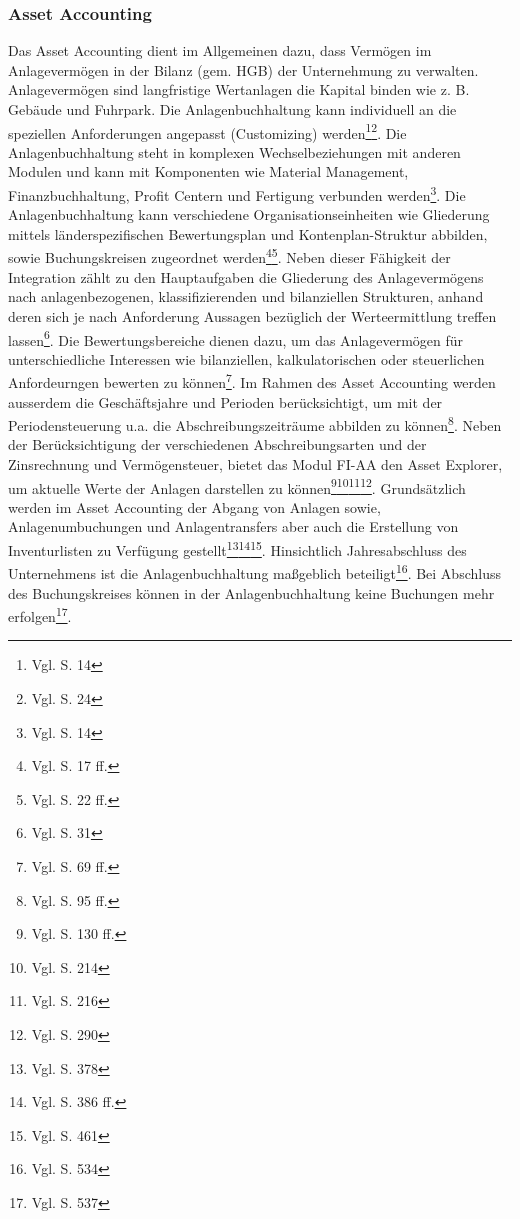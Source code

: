 \subsubsection{Asset Accounting} %
Das Asset Accounting dient im Allgemeinen dazu, dass Vermögen im Anlagevermögen in der Bilanz (gem. HGB) der Unternehmung zu verwalten. Anlagevermögen sind langfristige Wertanlagen die Kapital binden wie z. B. Gebäude und Fuhrpark. Die Anlagenbuchhaltung kann individuell an die speziellen Anforderungen angepasst (Customizing) werden\footnote{Vgl. \cite{SAPFIAA2001} S. 14}\footnote{Vgl. \cite{SAPFIAA2001} S. 24}. 
Die Anlagenbuchhaltung steht in komplexen Wechselbeziehungen mit anderen Modulen und kann mit Komponenten wie Material Management, Finanzbuchhaltung, Profit Centern und Fertigung verbunden werden\footnote{Vgl. \cite{SAPFIAA2001} S. 14}. Die Anlagenbuchhaltung kann verschiedene Organisationseinheiten wie Gliederung mittels länderspezifischen Bewertungsplan und Kontenplan-Struktur abbilden, sowie Buchungskreisen zugeordnet werden\footnote{Vgl. \cite{SAPFIAA2001} S. 17 ff.}\footnote{Vgl. \cite{SAPFIAA2001} S. 22 ff.}.
Neben dieser Fähigkeit der Integration zählt zu den Hauptaufgaben die Gliederung des Anlagevermögens nach anlagenbezogenen, klassifizierenden und bilanziellen Strukturen, anhand deren sich je nach Anforderung Aussagen bezüglich der Werteermittlung treffen lassen\footnote{Vgl. \cite{SAPFIAA2001} S. 31}. Die Bewertungsbereiche dienen dazu, um das Anlagevermögen für unterschiedliche Interessen wie bilanziellen, kalkulatorischen oder steuerlichen Anfordeurngen bewerten zu können\footnote{Vgl. \cite{SAPFIAA2001} S. 69 ff.}.
Im Rahmen des Asset Accounting werden ausserdem die Geschäftsjahre und Perioden berücksichtigt, um mit der Periodensteuerung u.a. die Abschreibungszeiträume abbilden zu können\footnote{Vgl. \cite{SAPFIAA2001} S. 95 ff.}. Neben der Berücksichtigung der verschiedenen Abschreibungsarten und der Zinsrechnung und Vermögensteuer, bietet das Modul FI-AA den Asset Explorer, um aktuelle Werte der Anlagen darstellen zu können\footnote{Vgl. \cite{SAPFIAA2001} S. 130 ff.}\footnote{Vgl. \cite{SAPFIAA2001} S. 214}\footnote{Vgl. \cite{SAPFIAA2001} S. 216}\footnote{Vgl. \cite{SAPFIAA2001} S. 290}. Grundsätzlich werden im Asset Accounting der Abgang von Anlagen sowie, Anlagenumbuchungen und Anlagentransfers aber auch die Erstellung von Inventurlisten zu Verfügung gestellt\footnote{Vgl. \cite{SAPFIAA2001} S. 378}\footnote{Vgl. \cite{SAPFIAA2001} S. 386 ff.}\footnote{Vgl. \cite{SAPFIAA2001} S. 461}.
Hinsichtlich Jahresabschluss des Unternehmens ist die Anlagenbuchhaltung maßgeblich beteiligt\footnote{Vgl. \cite{SAPFIAA2001} S. 534}. Bei Abschluss des Buchungskreises können in der Anlagenbuchhaltung keine Buchungen mehr erfolgen\footnote{Vgl. \cite{SAPFIAA2001} S. 537}.

